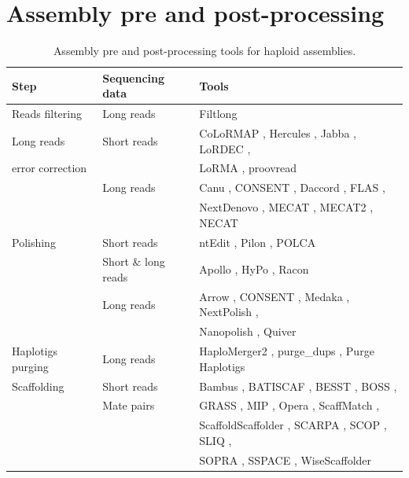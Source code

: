 \section{Assembly pre and post-processing}

\begin{table}
\caption{Assembly pre and post-processing tools for haploid assemblies.}
\begin{tabular}{|l|l|l|}
\hline
\textbf{Step} & \textbf{Sequencing data} &\textbf{Tools} \\
\hline
Reads filtering & Long reads & Filtlong \cite{filtlong} \\
\hline
Long reads & Short reads & CoLoRMAP \cite{colormap}, Hercules \cite{hercules}, Jabba \cite{jabba}, LoRDEC \cite{lordec}, \\
error correction &  & LoRMA \cite{lorma}, proovread \cite{proovread} \\
    \cline{2-3}
    & Long reads & Canu \cite{canu}, CONSENT \cite{consent}, Daccord \cite{daccord}, FLAS \cite{flas}, \\
    &  & NextDenovo \cite{nextdenovo}, MECAT \cite{mecat}, MECAT2 \cite{mecat}, NECAT \cite{necat} \\
\hline
Polishing & Short reads & ntEdit \cite{ntedit}, Pilon \cite{pilon}, POLCA \cite{polca} \\
    \cline{2-3}
    & Short \& long reads & Apollo \cite{apollo}, HyPo \cite{hypo}, Racon \cite{racon} \\
    \cline{2-3}
    & Long reads & Arrow \cite{quiver_arrow}, CONSENT \cite{consent}, Medaka \cite{medaka}, NextPolish \cite{nextpolish}, \\
    &  & Nanopolish \cite{nanopolish}, Quiver \cite{quiver_arrow} \\
\hline
Haplotigs purging & Long reads & HaploMerger2 \cite{haplomerger2}, purge\_dups \cite{purge_dups}, Purge Haplotigs \cite{purge_haplotigs} \\
\hline
Scaffolding & Short reads & Bambus \cite{bambus}, BATISCAF \cite{batiscaf}, BESST \cite{besst}, BOSS \cite{boss}, \\
    & Mate pairs & GRASS \cite{grass}, MIP \cite{mip}, Opera \cite{opera}, ScaffMatch \cite{scaffmatch}, \\
    &  & ScaffoldScaffolder \cite{scaffoldscaffolder}, SCARPA \cite{scarpa}, SCOP \cite{scop}, SLIQ \cite{sliq}, \\
    &  & SOPRA \cite{sopra}, SSPACE \cite{sspace}, WiseScaffolder \cite{wisescaffolder} \\
    \cline{2-3}

\end{tabular}
\end{table}
